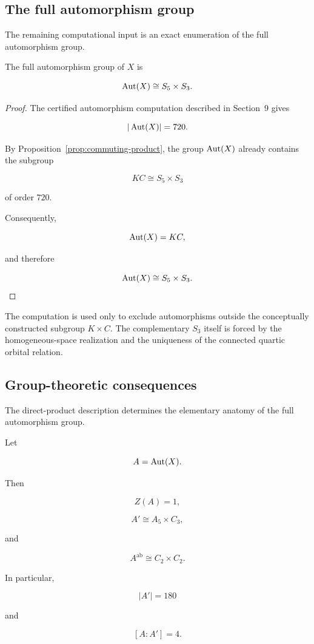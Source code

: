 \subsection{The full automorphism group}


The remaining computational input is an exact enumeration of the full
automorphism group.

\begin{theorem}
\label{thm:full-automorphism-group}

The full automorphism group of \(X\) is

\[
\operatorname{Aut}(X)
\cong
S_{5}\times S_{3}.
\]

\end{theorem}

\begin{proof}

The certified automorphism computation described in Section~9 gives

\[
|\operatorname{Aut}(X)|=720.
\]

By Proposition~\ref{prop:commuting-product}, the group \(\operatorname{Aut}(X)\)
already contains the subgroup

\[
KC
\cong
S_{5}\times S_{3}
\]

of order \(720\).

Consequently,

\[
\operatorname{Aut}(X)=KC,
\]

and therefore

\[
\operatorname{Aut}(X)
\cong
S_{5}\times S_{3}.
\]
\end{proof}

The computation is used only to exclude automorphisms outside the
conceptually constructed subgroup \(K\times C\). The complementary
\(S_{3}\) itself is forced by the homogeneous-space realization and the
uniqueness of the connected quartic orbital relation.

\subsection{Group-theoretic consequences}


The direct-product description determines the elementary anatomy of the
full automorphism group.

\begin{corollary}
\label{cor:group-anatomy}

Let

\[
A=\operatorname{Aut}(X).
\]

Then

\[
Z(A)=1,
\]

\[
A'
\cong
A_{5}\times C_{3},
\]

and

\[
A^{\mathrm{ab}}
\cong
C_{2}\times C_{2}.
\]

In particular,

\[
|A'|=180
\]

and

\[
[A:A']=4.
\]

\end{corollary}

